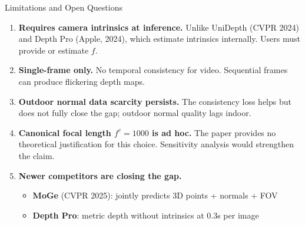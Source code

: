 \begin{frame}{Limitations and Open Questions}
\begin{enumerate}
  \item \textbf{Requires camera intrinsics at inference.} Unlike UniDepth (CVPR 2024) and Depth Pro (Apple, 2024), which estimate intrinsics internally. Users must provide or estimate $f$.

  \vspace{0.15cm}
  \item \textbf{Single-frame only.} No temporal consistency for video. Sequential frames can produce flickering depth maps.

  \vspace{0.15cm}
  \item \textbf{Outdoor normal data scarcity persists.} The consistency loss helps but does not fully close the gap; outdoor normal quality lags indoor.

  \vspace{0.15cm}
  \item \textbf{Canonical focal length $f^c = 1000$ is ad hoc.} The paper provides no theoretical justification for this choice. Sensitivity analysis would strengthen the claim.

  \vspace{0.15cm}
  \item \textbf{Newer competitors are closing the gap.}
    \begin{itemize}
      \item \textbf{MoGe} (CVPR 2025): jointly predicts 3D points + normals + FOV
      \item \textbf{Depth Pro}: metric depth without intrinsics at 0.3s per image
    \end{itemize}
\end{enumerate}
\end{frame}
